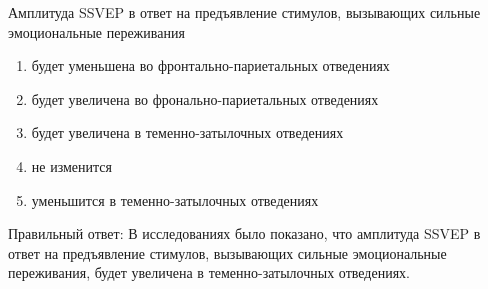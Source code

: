 
Амплитуда SSVEP в ответ на предъявление стимулов, вызывающих сильные эмоциональные переживания

\begin{enumerate}
    \item будет уменьшена во фронтально-париетальных отведениях
    \item будет увеличена во фронально-париетальных отведениях
    \item будет увеличена в теменно-затылочных отведениях
    \item не изменится
    \item уменьшится в теменно-затылочных отведениях
\end{enumerate}

\explanationSection

Правильный ответ: В исследованиях было показано, что амплитуда SSVEP в ответ на предъявление стимулов, вызывающих сильные эмоциональные переживания, будет увеличена в теменно-затылочных отведениях.

